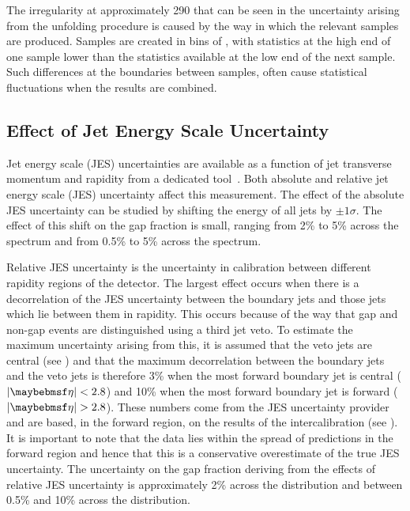 The irregularity at approximately \unit{290}{\GeV} that can be seen in the uncertainty
arising from the unfolding procedure is caused by the way in which the relevant \MC samples are produced. Samples
are created in bins of \pT, with statistics at the high end of one sample lower
than the statistics available at the low end of the next sample. Such differences
at the boundaries between samples, often cause statistical fluctuations when the
results are combined.

\subsection{Effect of Jet Energy Scale Uncertainty}
\label{sec:gbj:jes_uncertainty}
Jet energy scale (JES) uncertainties are available as a function of jet transverse
momentum and rapidity from a dedicated \ATLAS tool~\cite{ATLAS-CONF-2010-056}.
Both absolute and relative jet energy scale (JES) uncertainty affect this measurement.
The effect of the absolute JES uncertainty can be studied by shifting the energy
of all jets by $\pm 1 \sigma$. The effect of this shift on the gap fraction is
small, ranging from 2\% to 5\% across the \pTbar spectrum and from 0.5\% to 5\%
across the \DeltaY spectrum.

Relative JES uncertainty is the uncertainty in calibration between different
rapidity regions of the detector. The largest effect occurs when there is a decorrelation of the
JES uncertainty between the boundary jets and those jets which lie between them
in rapidity. This occurs because of the way that gap and non-gap events are distinguished
using a third jet veto. To estimate the maximum uncertainty arising from this, it is
assumed that the veto jets are central (see ) and that the maximum
decorrelation between the boundary jets and the veto jets is therefore 3\% when
the most forward boundary jet is central ($|\pseudorap|<2.8$) and 10\% when the
most forward boundary jet is forward ($|\pseudorap|>2.8$). These numbers come
from the \ATLAS JES uncertainty provider~\cite{ATLAS-CONF-2010-056} and are based, in the forward region,
on the results of the \dijet intercalibration (see ).
It is important to note that the data lies within the spread of \MC predictions in the forward region
and hence that this is a conservative overestimate of the true JES uncertainty.
The uncertainty on the gap fraction deriving from the effects of relative JES uncertainty
is approximately 2\% across the \pTbar distribution and between 0.5\% and 10\% across
the \DeltaY distribution.

